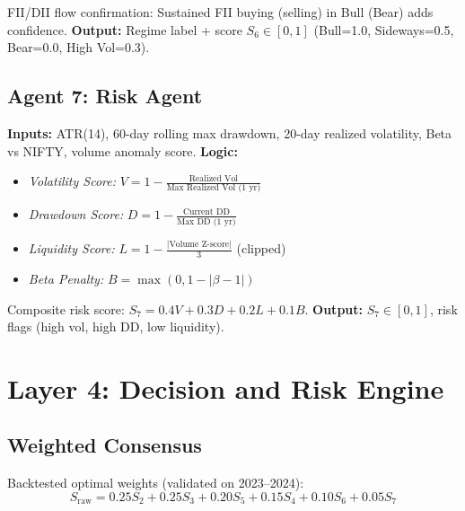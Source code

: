 \documentclass[12pt,a4paper]{report}
\begin{document}
FII/DII flow confirmation: Sustained FII buying (selling) in Bull (Bear) adds confidence.
\textbf{Output:} Regime label + score $S_6 \in [0,1]$ (Bull=1.0, Sideways=0.5, Bear=0.0, High Vol=0.3).

\subsection{Agent 7: Risk Agent}
\textbf{Inputs:} ATR(14), 60-day rolling max drawdown, 20-day realized volatility, Beta vs NIFTY, volume anomaly score.
\textbf{Logic:}
\begin{itemize}
\item \textit{Volatility Score:} $V = 1 - \frac{\text{Realized Vol}}{\text{Max Realized Vol (1 yr)}}$
\item \textit{Drawdown Score:} $D = 1 - \frac{\text{Current DD}}{\text{Max DD (1 yr)}}$
\item \textit{Liquidity Score:} $L = 1 - \frac{|\text{Volume Z-score}|}{3}$ (clipped)
\item \textit{Beta Penalty:} $B = \max(0, 1 - |\beta - 1|)$
\end{itemize}
Composite risk score: $S_7 = 0.4V + 0.3D + 0.2L + 0.1B$.
\textbf{Output:} $S_7 \in [0,1]$, risk flags (high vol, high DD, low liquidity).

\section{Layer 4: Decision and Risk Engine}
\subsection{Weighted Consensus}
Backtested optimal weights (validated on 2023--2024):
\begin{equation}
S_{\text{raw}} = 0.25 S_2 + 0.25 S_3 + 0.20 S_5 + 0.15 S_4 + 0.10 S_6 + 0.05 S_7
\end{equation}
\end{document}
